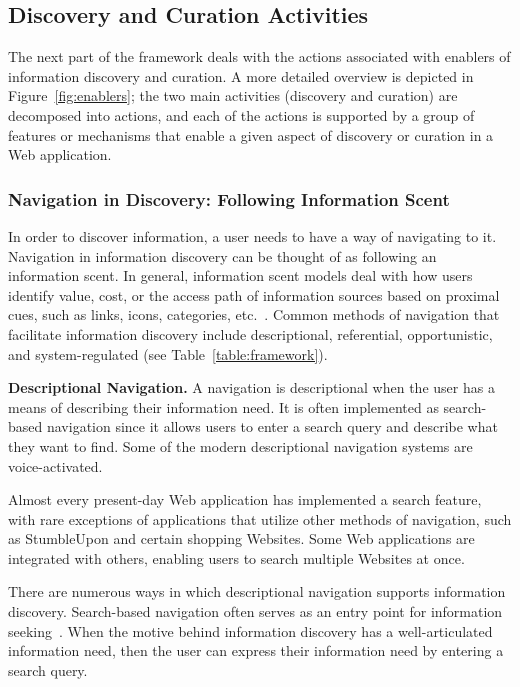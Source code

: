 \documentclass{sigchi}
\newcommand{\feature}[1]{{\ttfamily#1}}
\begin{document}
{\subsection{Discovery and Curation Activities}

The next part of the framework deals with the actions associated with enablers of information discovery and curation. A more detailed overview is depicted in Figure~\ref{fig:enablers}; the two main activities (discovery and curation) are decomposed into actions, and each of the actions is supported by a group of features or mechanisms that enable a given aspect of discovery or curation in a Web application.

{\subsubsection{Navigation in Discovery: Following Information Scent}
In order to discover information, a user needs to have a way of navigating to it. Navigation in information discovery can be thought of as following an information scent. In general, information scent models deal with how users identify value, cost, or the access path of information sources based on proximal cues, such as links, icons, categories, etc.~\cite{pirolli1999information}. Common methods of navigation that facilitate information discovery include descriptional, referential, opportunistic, and system-regulated (see Table~\ref{table:framework}). 

\textbf{Descriptional Navigation.} A navigation is descriptional when the user has a means of describing their information need. It is often implemented as \feature{search-based navigation} since it allows users to enter a search query and describe what they want to find. Some of the modern descriptional navigation systems are voice-activated. 

Almost every present-day Web application has implemented a search feature, with rare exceptions of applications that utilize other methods of navigation, such as StumbleUpon and certain shopping Websites. Some Web applications are \feature{integrated} with others, enabling users to search multiple Websites at once.    

There are numerous ways in which descriptional navigation supports information discovery. Search-based navigation often serves as an entry point for information seeking~\cite{levene2011introduction}. When the motive behind information discovery has a well-articulated information need, then the user can express their information need by entering a search query. 

}}
\end{document}
